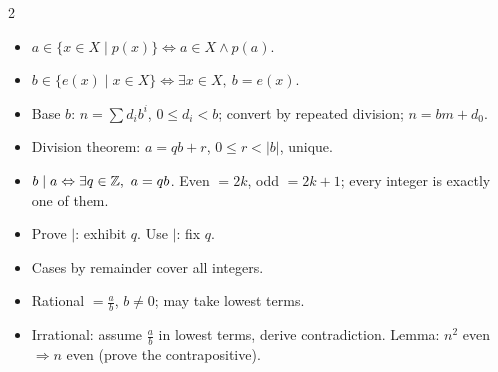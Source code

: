 
\begin{multicols}{2}\small
\begin{itemize}
\item $a\in\{x\in X\mid p(x)\}\Leftrightarrow a\in X\wedge p(a)$.
\item $b\in\{e(x)\mid x\in X\}\Leftrightarrow\exists x\in X,\ b=e(x)$.
\item Base $b$: $n=\sum d_ib^i$, $0\le d_i<b$; convert by repeated division; $n=bm+d_0$.
\item Division theorem: $a=qb+r$, $0\le r<|b|$, unique.
\item $b\mid a\Leftrightarrow\exists q\in\Z,\ a=qb$. Even $=2k$, odd $=2k+1$; every integer is exactly one of them.
\item Prove $\mid$: exhibit $q$. Use $\mid$: fix $q$.
\item Cases by remainder cover all integers.
\item Rational $=\frac ab$, $b\neq0$; may take lowest terms.
\item Irrational: assume $\frac ab$ in lowest terms, derive contradiction. Lemma: $n^2$ even $\Rightarrow n$ even (prove the contrapositive).
\end{itemize}
\end{multicols}
